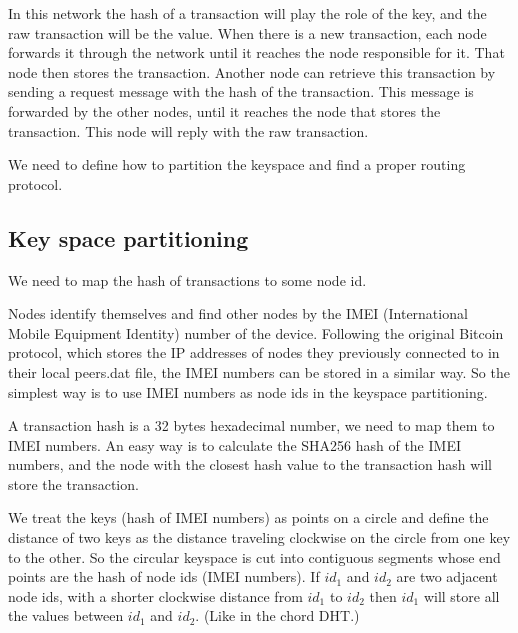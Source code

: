 \documentclass[a4paper,12pt]{article}
\begin{document}
\newpage

In this network the hash of a transaction will play the role of the key, and the raw transaction will be the value. When there is a new transaction, each node forwards it through the network until it reaches the node responsible for it. That node then stores the transaction. Another node can retrieve this transaction by sending a request message with the hash of the transaction. This message is forwarded by the other nodes, until it reaches the node that stores the transaction. This node will reply with the raw transaction.


We need to define how to partition the keyspace and find a proper routing protocol.

\subsection{Key space partitioning}

We need to map the hash of transactions to some node id.

Nodes identify themselves and find other nodes by the IMEI (International Mobile Equipment Identity) number of the device. Following the original Bitcoin protocol, which stores the IP addresses of nodes they previously connected to in their local peers.dat file, the IMEI numbers can be stored in a similar way. So the simplest way is to use IMEI numbers as node ids in the keyspace partitioning.

A transaction hash is a 32 bytes hexadecimal number, we need to map them to IMEI numbers. An easy way is to calculate the SHA256 hash of the IMEI numbers, and the node with the closest hash value to the transaction hash will store the transaction.

We treat the keys (hash of IMEI numbers) as points on a circle and define the distance of two keys as the distance traveling clockwise on the circle from one key to the other. So the circular keyspace is cut into contiguous segments whose end points are the hash of node ids (IMEI numbers). If $id_1$ and $id_2$ are two adjacent node ids, with a shorter clockwise distance from $id_1$ to $id_2$ then $id_1$ will store all the values between $id_1$ and $id_2$. (Like in the chord DHT.)
\end{document}
